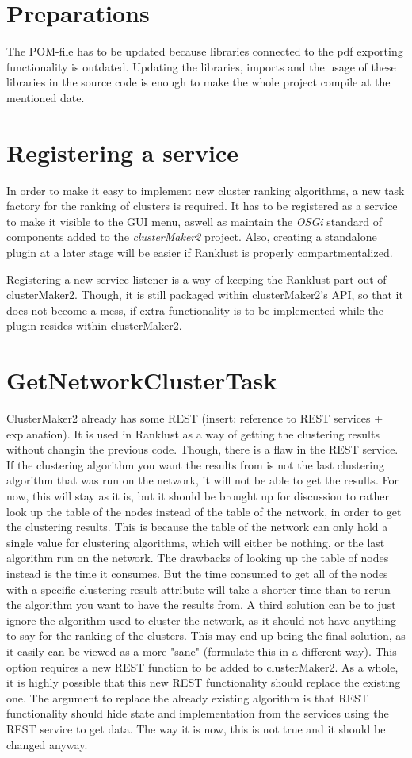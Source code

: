 \section{Preparations}
The POM-file has to be updated because libraries connected to the pdf exporting
functionality is outdated. Updating the libraries, imports and the usage of
these libraries in the source code is enough to make the whole project compile
at the mentioned date.

\section{Registering a service}
In order to make it easy to implement new cluster ranking algorithms, a new task
factory for the ranking of clusters is required. It has to be registered as a
service to make it visible to the GUI menu, aswell as maintain the \textit{OSGi}
standard of components added to the \textit{clusterMaker2} project. Also,
creating a standalone plugin at a later stage will be easier if Ranklust is
properly compartmentalized.

Registering a new service listener is a way of keeping the Ranklust part out of
clusterMaker2. Though, it is still packaged within clusterMaker2's API, so that
it does not become a mess, if extra functionality is to be implemented while the
plugin resides within clusterMaker2.

\section{GetNetworkClusterTask}
ClusterMaker2 already has some REST (insert: reference to REST services +
explanation). It is used in Ranklust as a way of getting the clustering results
without changin the previous code. Though, there is a flaw in the REST service.
If the clustering algorithm you want the results from is not the last clustering
algorithm that was run on the network, it will not be able to get the results.
For now, this will stay as it is, but it should be brought up for discussion to
rather look up the table of the nodes instead of the table of the network, in
order to get the clustering results. This is because the table of the network
can only hold a single value for clustering algorithms, which will either be
nothing, or the last algorithm run on the network. The drawbacks of looking up
the table of nodes instead is the time it consumes. But the time consumed to get
all of the nodes with a specific clustering result attribute will take a shorter
time than to rerun the algorithm you want to have the results from. A third
solution can be to just ignore the algorithm used to cluster the network, as it
should not have anything to say for the ranking of the clusters. This may end up
being the final solution, as it easily can be viewed as a more "sane" (formulate
this in a different way). This option requires a new REST function to be added
to clusterMaker2. As a whole, it is highly possible that this new REST
functionality should replace the existing one. The argument to replace the
already existing algorithm is that REST functionality should hide state and
implementation from the services using the REST service to get data. The way it
is now, this is not true and it should be changed anyway.


